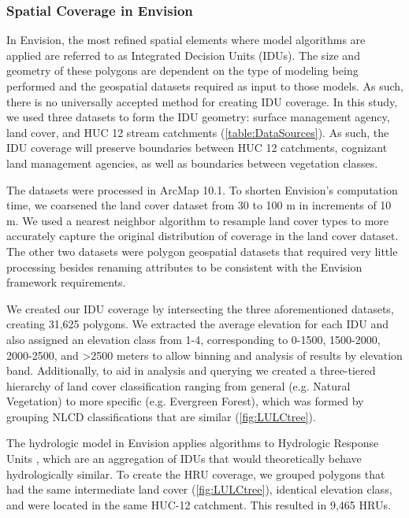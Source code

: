 \documentclass[water,article,submit,moreauthors,pdftex,10pt,a4paper]{mdpi}
\theoremstyle{mdpi}
\newcounter{thm}
\newcounter{ex}
\newcounter{re}
\theoremstyle{mdpidefinition}
\begin{document}
\subsubsection{Spatial Coverage in Envision}

In Envision, the most refined spatial elements where model algorithms are applied are referred to as Integrated Decision Units (IDUs). The size and geometry of these polygons are dependent on the type of modeling being performed and the geospatial datasets required as input to those models. As such, there is no universally accepted method for creating IDU coverage. In this study, we used three datasets to form the IDU geometry: surface management agency, land cover, and HUC 12 stream catchments (\cref{table:DataSources}). As such, the IDU coverage will preserve boundaries between HUC 12 catchments, cognizant land management agencies, as well as boundaries between vegetation classes.  

The datasets were processed in ArcMap 10.1. To shorten Envision's computation time, we coarsened the land cover dataset from 30 to 100 m in increments of 10 m. We used a nearest neighbor algorithm to resample land cover types to more accurately capture the original distribution of coverage in the land cover dataset. The other two datasets were polygon geospatial datasets that required very little processing besides renaming attributes to be consistent with the Envision framework requirements.

We created our IDU coverage by intersecting the three aforementioned datasets, creating 31,625 polygons. We extracted the average elevation for each IDU and also assigned an elevation class from 1-4, corresponding to 0-1500, 1500-2000, 2000-2500, and >2500 meters to allow binning and analysis of results by elevation band. Additionally, to aid in analysis and querying we created a three-tiered hierarchy of land cover classification ranging from general (e.g. Natural Vegetation) to more specific (e.g. Evergreen Forest), which was formed by grouping NLCD classifications that are similar (\cref{fig:LULCtree}).

The hydrologic model in Envision applies algorithms to Hydrologic Response Units \citep[HRUs,][]{Jin:2011ii,Turner:2016ia}, which are an aggregation of IDUs that would theoretically behave hydrologically similar. To create the HRU coverage, we grouped polygons that had the same intermediate land cover (\cref{fig:LULCtree}), identical elevation class, and were located in the same HUC-12 catchment. This resulted in 9,465 HRUs.
\end{document}
